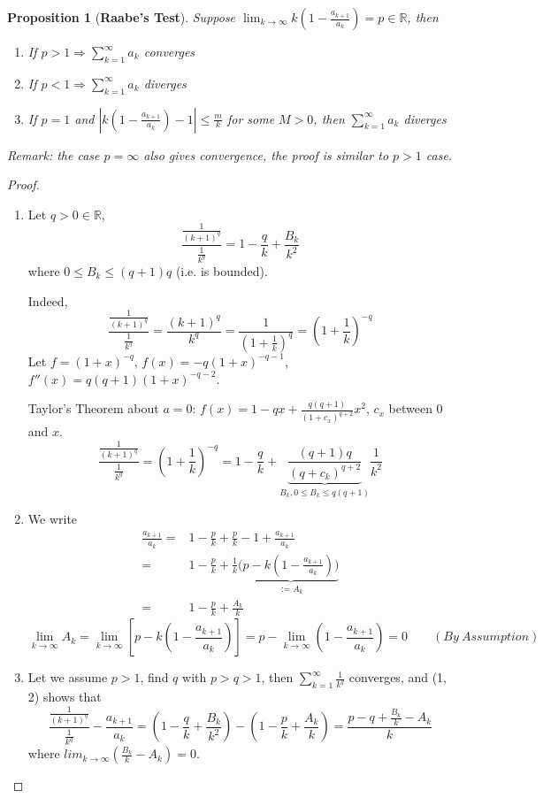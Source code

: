 \documentclass[12pt]{article}
\theoremstyle{plain}
\newtheorem{proposition}{Proposition}[subsection]
\newcommand{\abs}[1]{\left| #1 \right|}
\newcommand{\mR}{{\mathbb{R}}}
\begin{document}
\begin{proposition}[\textbf{Raabe's Test}]
	Suppose $\lim_{k\to\infty} k (1-\frac{a_{k+1}}{a_k}) = p \in \mR$,
	then 
	\begin{enumerate}
		\item If $p > 1 \Rightarrow \sum_{k=1}^{\infty} a_k$ converges
		\item If $p < 1 \Rightarrow \sum_{k=1}^{\infty} a_k$ diverges
		\item If $p = 1$ and $\abs{k(1-\frac{a_{k+1}}{a_k})-1}\leq \frac mk$ 
			for some $M>0$, then $\sum_{k=1}^{\infty} a_k$ diverges
	\end{enumerate}
	\textit{Remark:} the case $p = \infty$ also gives convergence, the proof is
	similar to $p > 1$ case. 
\end{proposition}
\begin{proof}
	$ $
\begin{enumerate}
\item 
	Let $q>0 \in \mR$, 
	\[
		\frac{\frac 1{(k+1)^q}}{\frac 1{k^q}} = 1-\frac qk + \frac{B_k}{k^2}
	\]
	where $0 \leq B_k \leq (q+1)q$ (i.e. is bounded).

	Indeed, 
	\[
		\frac{\frac 1{(k+1)^q}}{\frac 1{k^q}} = 
		\frac{(k+1)^q}{k^q}
		= \frac1{(1+\frac1k)^q}
		= (1+\frac 1k)^{-q}
	\]
	Let $f = (1+x)^{-q}$, $f(x) = -q(1+x)^{-q-1}$, $f''(x) = q(q+1)(1+x)^{-q-2}$.

	Taylor's Theorem about $a = 0$: $\displaystyle f(x) = 1-qx + \frac{q(q+1)}{(1+c_x)^{q+2}}x^2$,
	$c_x$ between $0$ and $x$.
	\[
		\frac{\frac 1{(k+1)^q}}{\frac 1{k^q}} 
		= (1+\frac 1k)^{-q}
		= 1- \frac qk + 
		\underbrace{\frac{(q+1)q}{(q+c_k)^{q+2}}}_{B_k, 0\leq B_k \leq q(q+1)}
		\frac 1{k^2} 
	\]

\item
	We write 
	\begin{align*}
		\frac{a_{k+1}}{a_k} 
		=& 1-\frac pk + \frac pk - 1 + \frac{a_{k+1}}{a_k}	\\
	=& 1- \frac pk + \frac 1k (\underbrace{p-k(1-\frac {a_{k+1}}{a_k}))}_{:=A_k}\\
	=& 1- \frac pk + \frac{A_k}k
	\end{align*}
\[
	\lim_{k\to\infty} A_k = \lim_{k\to\infty} [p-k(1-\frac{a_{k+1}}{a_k})]
	= p - \lim_{k\to\infty} (1-\frac{a_{k+1}}{a_k}) = 0 
	\qquad (By \ Assumption)
\]

\item Let we assume $p > 1$, find $q$ with $p > q > 1$, then 
	$\sum_{k=1}^{\infty} \frac1{k^q}$ converges, and (1, 2) shows that 
	\[
		\frac{\frac 1{(k+1)^q}}{\frac 1{k^q}} - \frac{a_{k+1}}{a_k}
		 = (1-\frac qk + \frac{B_k}{k^2}) - (1-\frac pk + \frac{A_k}k)
		 = \frac{p-q+\frac{B_k}k - A_k}k
	\]
	where $lim_{k\to\infty}(\frac{B_k}k - A_k)=0$.
	

\end{enumerate}
\end{proof}
\end{document}

